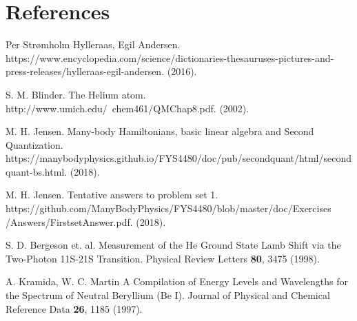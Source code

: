 \newpage
\section{References}

\begingroup
\renewcommand{\section}[2]{}
\begin{thebibliography}{}
	Per Str\o mholm
	Hylleraas, Egil Andersen. 
	https://www.encyclopedia.com/science/dictionaries-thesauruses-pictures-and-press-releases/hylleraas-egil-andersen.
	(2016).
	
	S. M. Blinder. 
	The Helium atom. 
	http://www.umich.edu/~chem461/QMChap8.pdf.
	(2002).
	
	M. H. Jensen.
	Many-body Hamiltonians, basic linear algebra and Second Quantization.
	https://manybodyphysics.github.io/FYS4480/doc/pub/secondquant/html/secondquant-bs.html.
	(2018).
	
	M. H. Jensen.
	Tentative answers to problem set 1.
	https://github.com/ManyBodyPhysics/FYS4480/blob/master/doc/Exercises /Answers/FirstsetAnswer.pdf.
	(2018).
	
	S. D. Bergeson et. al.
	Measurement of the He Ground State Lamb Shift via the Two-Photon 11S-21S Transition.
	Physical Review Letters \textbf{80}, 3475
	(1998).
	
	A. Kramida, W. C. Martin
	A Compilation of Energy Levels and Wavelengths for the Spectrum of Neutral Beryllium (Be I).
	Journal of Physical and Chemical Reference Data \textbf{26}, 1185
	(1997).
	
	
	

	
\end{thebibliography}
\endgroup